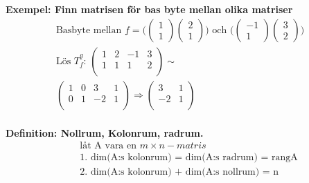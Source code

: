 \textbf{Exempel: Finn matrisen för bas byte mellan olika matriser} 
\begin{align*}
  &\quad  \text{Basbyte mellan } \underline{f} =
  \Big( \begin{pmatrix} 1 \\ 1 \end{pmatrix} \begin{pmatrix} 2 \\ 1 \end{pmatrix} \Big)
  \text{ och }
  \Big( \begin{pmatrix} -1 \\ 1 \end{pmatrix} \begin{pmatrix} 3 \\ 2 \end{pmatrix} \Big)
  &\quad  \\
  &\quad  \text{Lös } T^{\underline{g}}_{\underline{f}}: \,
  \left(\begin{array}{cc|cc}
    1 & 2 & -1 & 3  \\
    1 & 1 &  1 & 2  \\
  \end{array}\right) \sim{} \\
  &\quad
  \left(\begin{array}{cc|cc}
    1 & 0 &   3 & 1  \\
    0 & 1 &  -2 & 1  \\
  \end{array}\right) \Rightarrow{}
  \left(\begin{array}{cc}
    3 & 1  \\
   -2 & 1  \\
  \end{array}\right)  \\
\end{align*}


\textbf{Definition: Nollrum, Kolonrum, radrum.} 
\begin{align*}
  &\quad  \text{låt A vara en $m\times n-matris$} \\
  &\quad  \text{1. dim(A:s kolonrum) = dim(A:s radrum) = rangA} \\
  &\quad  \text{2. dim(A:s kolonrum) + dim(A:s nollrum) = n} \\
\end{align*}


